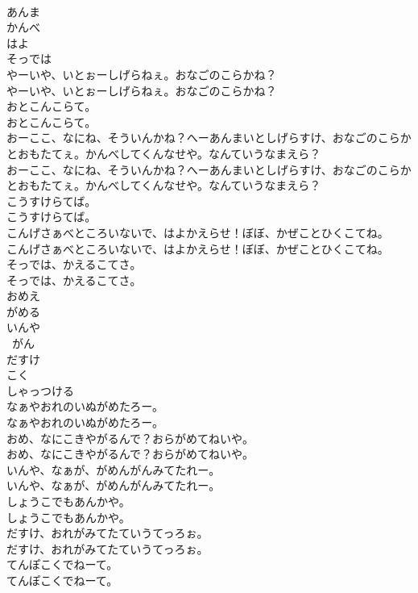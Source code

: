 \documentclass[8pt]{extreport}
\begin{document}
\begin{CJK}{UTF8}{min}
\\	あんま
\\	かんべ
\\	はよ
\\	そっでは
\\	やーいや、いとぉーしげらねぇ。おなごのこらかね？	
\\	やーいや、いとぉーしげらねぇ。おなごのこらかね？ 
\\	おとこんこらて。	
\\	おとこんこらて。 
\\	おーここ、なにね、そういんかね？へーあんまいとしげらすけ、おなごのこらかとおもたてぇ。かんべしてくんなせや。なんていうなまえら？	
\\	おーここ、なにね、そういんかね？へーあんまいとしげらすけ、おなごのこらかとおもたてぇ。かんべしてくんなせや。なんていうなまえら？ 
\\	こうすけらてば。	
\\	こうすけらてば。 
\\	こんげさぁべところいないで、はよかえらせ！ぼぼ、かぜことひくこてね。	
\\	こんげさぁべところいないで、はよかえらせ！ぼぼ、かぜことひくこてね。 
\\	そっでは、かえるこてさ。	
\\	そっでは、かえるこてさ。 
\\	おめえ
\\	がめる
\\	いんや
\\	~がん
\\	だすけ
\\	こく
\\	しゃっつける
\\	なぁやおれのいぬがめたろー。	
\\	なぁやおれのいぬがめたろー。 
\\	おめ、なにこきやがるんで？おらがめてねいや。	
\\	おめ、なにこきやがるんで？おらがめてねいや。 
\\	いんや、なぁが、がめんがんみてたれー。	
\\	いんや、なぁが、がめんがんみてたれー。 
\\	しょうこでもあんかや。	
\\	しょうこでもあんかや。 
\\	だすけ、おれがみてたていうてっろぉ。	
\\	だすけ、おれがみてたていうてっろぉ。 
\\	てんぽこくでねーて。	
\\	てんぽこくでねーて。 

\end{CJK}
\end{document}
